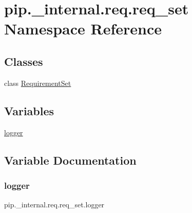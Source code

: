 \hypertarget{namespacepip_1_1__internal_1_1req_1_1req__set}{}\section{pip.\+\_\+internal.\+req.\+req\+\_\+set Namespace Reference}
\label{namespacepip_1_1__internal_1_1req_1_1req__set}
\subsection*{Classes}
\begin{DoxyCompactItemize}
\item 
class \hyperlink{classpip_1_1__internal_1_1req_1_1req__set_1_1RequirementSet}{Requirement\+Set}
\end{DoxyCompactItemize}
\subsection*{Variables}
\begin{DoxyCompactItemize}
\item 
\hyperlink{namespacepip_1_1__internal_1_1req_1_1req__set_aecb11d0487952b7abcf479d0a0c7ea53}{logger}
\end{DoxyCompactItemize}


\subsection{Variable Documentation}
\mbox{\label{namespacepip_1_1__internal_1_1req_1_1req__set_aecb11d0487952b7abcf479d0a0c7ea53}} 
\subsubsection{\texorpdfstring{logger}{logger}}
{\footnotesize\ttfamily pip.\+\_\+internal.\+req.\+req\+\_\+set.\+logger}

